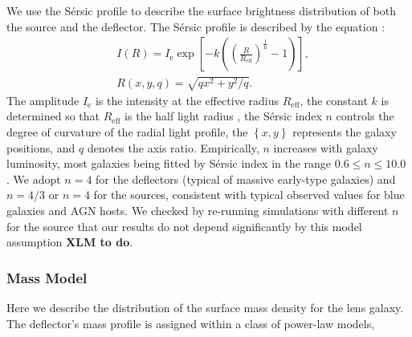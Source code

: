 \documentclass[a4paper,11pt]{article}
\begin{document}
We use the S\'ersic profile
\cite{1963BAAA....6...41S,1968adga.book.....S} to describe the surface
brightness distribution of both the source and the deflector. The
S\'ersic profile is described by the equation \cite{1993MNRAS.265.1013C}:
%
\begin{eqnarray}
   \label{eq:Intensity}
   &I(R) = I_{\mathrm{e}} \exp\left[-k\left(\left(\frac{R}{R_{\mathrm{eff}}}\right)^{\frac{1}{\mathrm{n}}}-1\right)\right] ,\\
   &R(x,y,q) = \sqrt{qx^2+y^2/q}.
\end{eqnarray}
%
The amplitude $I_{\mathrm{e}}$ is the intensity at the effective
radius $R_{\mathrm{eff}}$, the constant $k$ is determined so that
$R_{\mathrm{eff}}$ is the half light radius
\cite{1999A&A...352..447C}, the S\'ersic index $n$ controls the degree
of curvature of the radial light profile, the $\left\{x,y\right\}$
represents the galaxy positions, and $q$ denotes the axis
ratio. Empirically, $n$ increases with galaxy luminosity, most
galaxies being fitted by S\'ersic index in the range $0.6 \le n
\le 10.0$ \cite{2006AJ....132.2685M}. We adopt $n=4$ for the
deflectors (typical of massive early-type galaxies) and $n=4/3$ or
$n=4$ for the sources, consistent with typical observed values for
blue galaxies and AGN hosts. We checked by re-running simulations with
different $n$ for the source that our results do not depend
significantly by this model assumption {\bf XLM to do}.

\subsubsection{Mass Model}

Here we describe the distribution of the surface mass density for the
lens galaxy. The deflector's mass profile is assigned within a class
of power-law models,
\end{document}
